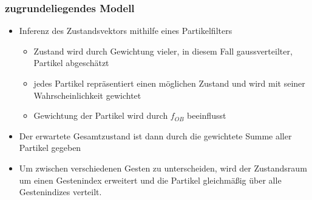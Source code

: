 \documentclass{beamer}
\begin{document}
\begin{frame}\frametitle{zugrundeliegendes Modell}
\begin{itemize}
\item Inferenz des Zustandsvektors mithilfe eines Partikelfilters
\begin{itemize}
\item Zustand wird durch Gewichtung vieler, in diesem Fall gaussverteilter, Partikel abgeschätzt
\item jedes Partikel repräsentiert einen möglichen Zustand und wird mit seiner Wahrscheinlichkeit gewichtet
\item Gewichtung der Partikel wird durch $f_{OB}$ beeinflusst
\end{itemize}
\item Der erwartete Gesamtzustand ist dann durch die gewichtete Summe aller Partikel gegeben
\item Um zwischen verschiedenen Gesten zu unterscheiden, wird der Zustandsraum um einen Gestenindex erweitert und die Partikel gleichmäßig über alle Gestenindizes verteilt.
\end{itemize}
\end{frame}
\end{document}
